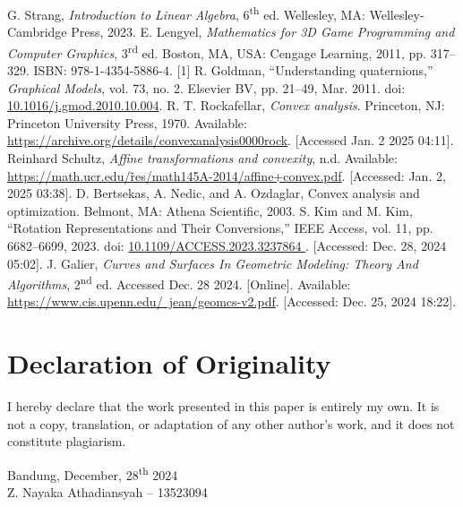 \documentclass[conference]{IEEEtran}
\begin{document}
\begin{thebibliography}{00}
 G. Strang, \textit{Introduction to Linear Algebra}, 6\textsuperscript{th} ed. Wellesley, MA: Wellesley-Cambridge Press, 2023.
 E. Lengyel, \textit{Mathematics for 3D Game Programming and Computer Graphics}, 3\textsuperscript{rd} ed. Boston, MA, USA: Cengage Learning, 2011, pp. 317--329. ISBN: 978-1-4354-5886-4.
 [1] R. Goldman, “Understanding quaternions,” \textit{Graphical Models}, vol. 73, no. 2. Elsevier BV, pp. 21–49, Mar. 2011. doi: \href{https://www.researchgate.net/publication/220632454_Understanding_quaternions}{10.1016/j.gmod.2010.10.004}.
 R. T. Rockafellar, \textit{Convex analysis}. Princeton, NJ: Princeton University Press, 1970. Available: \href{https://archive.org/details/convexanalysis0000rock}{https://archive.org/details/convexanalysis0000rock}. [Accessed Jan. 2 2025 04:11].
 Reinhard Schultz, \textit{Affine transformations and convexity}, n.d. Available: \href{https://math.ucr.edu/~res/math145A-2014/affine+convex.pdf}{https://math.ucr.edu/\~res/math145A-2014/affine+convex.pdf}. [Accessed: Jan. 2, 2025 03:38].
 D. Bertsekas, A. Nedic, and A. Ozdaglar, Convex analysis and optimization. Belmont, MA: Athena Scientific, 2003.
 S. Kim and M. Kim, “Rotation Representations and Their Conversions,” IEEE Access, vol. 11, pp. 6682–6699, 2023. doi: \href{https://ieeexplore.ieee.org/document/10019271}{10.1109/ACCESS.2023.3237864
}. [Accessed: Dec. 28, 2024 05:02].
 J. Galier, \textit{Curves and Surfaces In Geometric Modeling: Theory And Algorithms}, 2\textsuperscript{nd} ed. Accessed Dec. 28 2024. [Online]. Available: \href{https://www.cis.upenn.edu/~jean/geomcs-v2.pdf}{https://www.cis.upenn.edu/~jean/geomcs-v2.pdf}. [Accessed: Dec. 25, 2024 18:22].
\end{thebibliography}


\section*{Declaration of Originality}
I hereby declare that the work presented in this paper is entirely my own. It is not a copy, translation, or adaptation of any other author's work, and it does not constitute plagiarism.

\begin{flushright}
    Bandung, December, 28\textsuperscript{th} 2024 \\  
    Z. Nayaka Athadiansyah – 13523094
\end{flushright}
\end{document}
